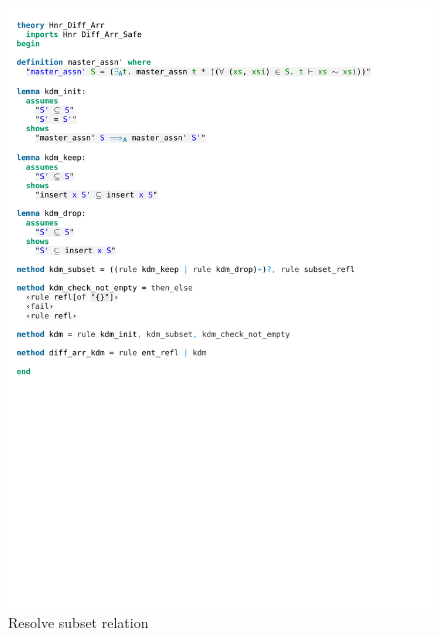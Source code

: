 \begin{figure}[!htpb]
    \includegraphics[trim={0 16,6cm 0 12,6cm}, clip, width=1.00\textwidth]{figures/Theory_Hnr_Diff_Arr_KDM.pdf}
    \caption[Resolve subset relation]{Resolve subset relation}
    \label{fig:kdm_subset}
\end{figure}

